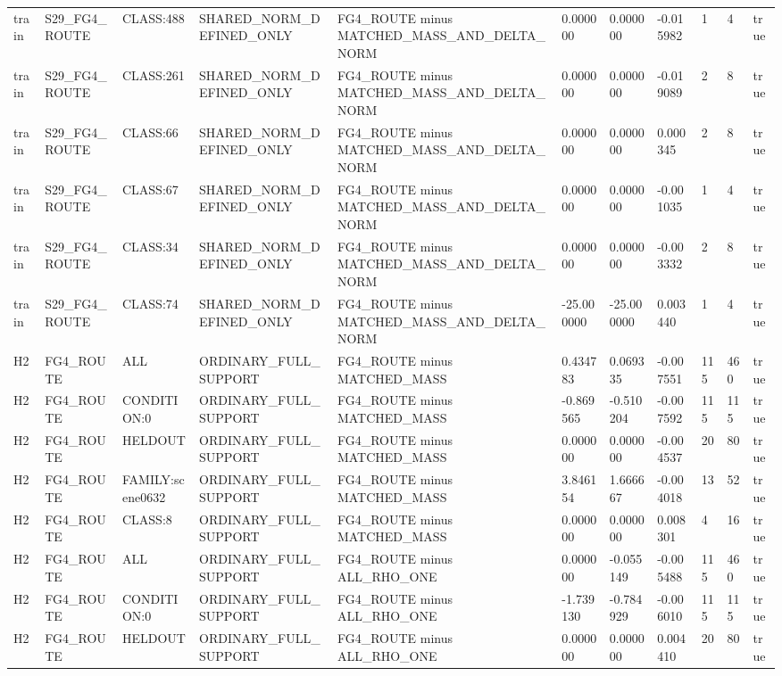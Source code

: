 \begin{tabular}{lllllllllll}
train & S29\_FG4\_ROUTE & CLASS:488 & SHARED\_NORM\_DEFINED\_ONLY & FG4\_ROUTE minus MATCHED\_MASS\_AND\_DELTA\_NORM & 0.000000 & 0.000000 & -0.015982 & 1 & 4 & true \\
train & S29\_FG4\_ROUTE & CLASS:261 & SHARED\_NORM\_DEFINED\_ONLY & FG4\_ROUTE minus MATCHED\_MASS\_AND\_DELTA\_NORM & 0.000000 & 0.000000 & -0.019089 & 2 & 8 & true \\
train & S29\_FG4\_ROUTE & CLASS:66 & SHARED\_NORM\_DEFINED\_ONLY & FG4\_ROUTE minus MATCHED\_MASS\_AND\_DELTA\_NORM & 0.000000 & 0.000000 & 0.000345 & 2 & 8 & true \\
train & S29\_FG4\_ROUTE & CLASS:67 & SHARED\_NORM\_DEFINED\_ONLY & FG4\_ROUTE minus MATCHED\_MASS\_AND\_DELTA\_NORM & 0.000000 & 0.000000 & -0.001035 & 1 & 4 & true \\
train & S29\_FG4\_ROUTE & CLASS:34 & SHARED\_NORM\_DEFINED\_ONLY & FG4\_ROUTE minus MATCHED\_MASS\_AND\_DELTA\_NORM & 0.000000 & 0.000000 & -0.003332 & 2 & 8 & true \\
train & S29\_FG4\_ROUTE & CLASS:74 & SHARED\_NORM\_DEFINED\_ONLY & FG4\_ROUTE minus MATCHED\_MASS\_AND\_DELTA\_NORM & -25.000000 & -25.000000 & 0.003440 & 1 & 4 & true \\
H2 & FG4\_ROUTE & ALL & ORDINARY\_FULL\_SUPPORT & FG4\_ROUTE minus MATCHED\_MASS & 0.434783 & 0.069335 & -0.007551 & 115 & 460 & true \\
H2 & FG4\_ROUTE & CONDITION:0 & ORDINARY\_FULL\_SUPPORT & FG4\_ROUTE minus MATCHED\_MASS & -0.869565 & -0.510204 & -0.007592 & 115 & 115 & true \\
H2 & FG4\_ROUTE & HELDOUT & ORDINARY\_FULL\_SUPPORT & FG4\_ROUTE minus MATCHED\_MASS & 0.000000 & 0.000000 & -0.004537 & 20 & 80 & true \\
H2 & FG4\_ROUTE & FAMILY:scene0632 & ORDINARY\_FULL\_SUPPORT & FG4\_ROUTE minus MATCHED\_MASS & 3.846154 & 1.666667 & -0.004018 & 13 & 52 & true \\
H2 & FG4\_ROUTE & CLASS:8 & ORDINARY\_FULL\_SUPPORT & FG4\_ROUTE minus MATCHED\_MASS & 0.000000 & 0.000000 & 0.008301 & 4 & 16 & true \\
H2 & FG4\_ROUTE & ALL & ORDINARY\_FULL\_SUPPORT & FG4\_ROUTE minus ALL\_RHO\_ONE & 0.000000 & -0.055149 & -0.005488 & 115 & 460 & true \\
H2 & FG4\_ROUTE & CONDITION:0 & ORDINARY\_FULL\_SUPPORT & FG4\_ROUTE minus ALL\_RHO\_ONE & -1.739130 & -0.784929 & -0.006010 & 115 & 115 & true \\
H2 & FG4\_ROUTE & HELDOUT & ORDINARY\_FULL\_SUPPORT & FG4\_ROUTE minus ALL\_RHO\_ONE & 0.000000 & 0.000000 & 0.004410 & 20 & 80 & true \\

\end{tabular}

